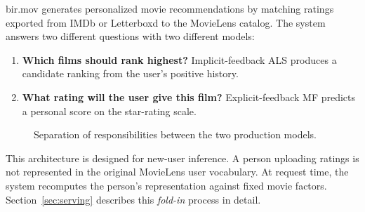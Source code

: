 \documentclass[11pt,a4paper]{article}
\begin{document}
bir.mov generates personalized movie recommendations by matching ratings exported from IMDb or Letterboxd to the MovieLens catalog. The system answers two different questions with two different models:

\begin{enumerate}
  \item \textbf{Which films should rank highest?} Implicit-feedback ALS produces a candidate ranking from the user's positive history.
  \item \textbf{What rating will the user give this film?} Explicit-feedback MF predicts a personal score on the star-rating scale.
\end{enumerate}

\begin{figure}[H]
\centering
{}
\caption{Separation of responsibilities between the two production models.}
\label{fig:architecture}
\end{figure}

This architecture is designed for new-user inference. A person uploading ratings is not represented in the original MovieLens user vocabulary. At request time, the system recomputes the person's representation against fixed movie factors. Section~\ref{sec:serving} describes this \textit{fold-in} process in detail.
\end{document}
